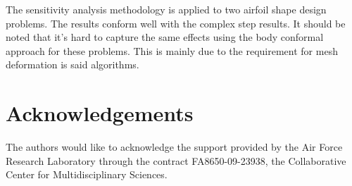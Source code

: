 \documentclass[12pt]{aiaa-pretty}
\begin{document}
The sensitivity analysis methodology is applied to two airfoil shape design problems. The results conform well with the complex step results. It should be noted that it's hard to capture the same effects using the body conformal approach for these problems. This is mainly due to the requirement for mesh deformation is said algorithms.
\section*{Acknowledgements}
The authors would like to acknowledge the support provided by the Air Force Research Laboratory through the contract FA8650-09-23938, the Collaborative Center for Multidisciplinary Sciences.


\end{document}
